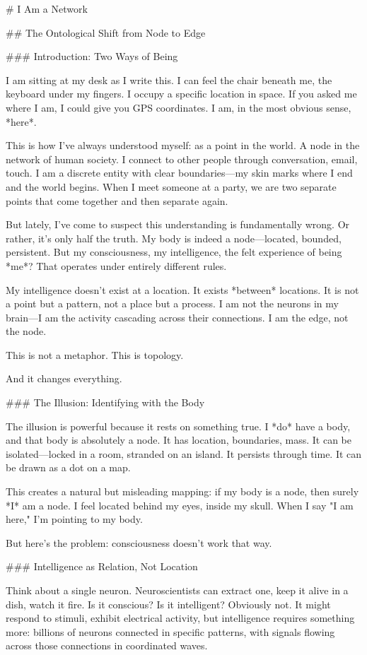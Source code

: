 # I Am a Network

## The Ontological Shift from Node to Edge

### Introduction: Two Ways of Being

I am sitting at my desk as I write this. I can feel the chair beneath me, the keyboard under my fingers. I occupy a specific location in space. If you asked me where I am, I could give you GPS coordinates. I am, in the most obvious sense, *here*.

This is how I've always understood myself: as a point in the world. A node in the network of human society. I connect to other people through conversation, email, touch. I am a discrete entity with clear boundaries—my skin marks where I end and the world begins. When I meet someone at a party, we are two separate points that come together and then separate again.

But lately, I've come to suspect this understanding is fundamentally wrong. Or rather, it's only half the truth. My body is indeed a node—located, bounded, persistent. But my consciousness, my intelligence, the felt experience of being *me*? That operates under entirely different rules.

My intelligence doesn't exist at a location. It exists *between* locations. It is not a point but a pattern, not a place but a process. I am not the neurons in my brain—I am the activity cascading across their connections. I am the edge, not the node.

This is not a metaphor. This is topology.

And it changes everything.

### The Illusion: Identifying with the Body

The illusion is powerful because it rests on something true. I *do* have a body, and that body is absolutely a node. It has location, boundaries, mass. It can be isolated—locked in a room, stranded on an island. It persists through time. It can be drawn as a dot on a map.

This creates a natural but misleading mapping: if my body is a node, then surely *I* am a node. I feel located behind my eyes, inside my skull. When I say "I am here," I'm pointing to my body.

But here's the problem: consciousness doesn't work that way.

### Intelligence as Relation, Not Location

Think about a single neuron. Neuroscientists can extract one, keep it alive in a dish, watch it fire. Is it conscious? Is it intelligent? Obviously not. It might respond to stimuli, exhibit electrical activity, but intelligence requires something more: billions of neurons connected in specific patterns, with signals flowing across those connections in coordinated waves.

